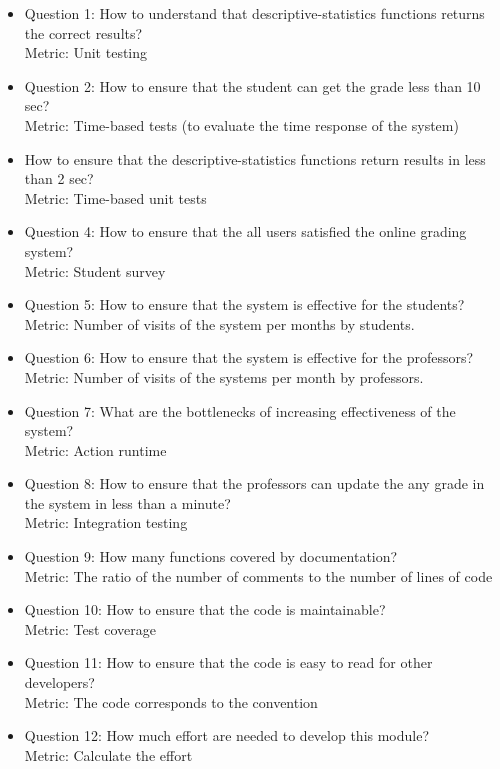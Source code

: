 \documentclass[12pt]{article}
\begin{document}
\begin{itemize}
   \item Question 1: How to understand that descriptive-statistics functions returns the correct results?\\
   Metric: Unit testing
   \item Question 2: How to ensure that the student can get the grade less than 10 sec?\\
   Metric: Time-based tests (to evaluate the time response of the system)
   \item  How to ensure that the descriptive-statistics functions return results in less than 2 sec? \\
   Metric: Time-based unit tests
   \item Question 4: How to ensure that the all users satisfied the online grading system?\\
   Metric: Student survey
   \item Question 5: How to ensure that the system is effective for the students?\\
   Metric: Number of visits of the system per months by students.
   \item Question 6: How to ensure that the system is effective for the professors?\\
   Metric: Number of visits of the systems per month by professors.
   \item Question 7: What are the bottlenecks of increasing effectiveness of the system?\\
   Metric: Action runtime
   \item Question 8: How to ensure that the professors can update the any grade in the system in less than a minute?\\
   Metric: Integration testing
   \item Question 9: How many functions covered by documentation?\\
   Metric: The ratio of the number of comments to the number of lines of code
   \item Question 10: How to ensure that the code is maintainable?\\
   Metric: Test coverage
   \item Question 11: How to ensure that the code is easy to read for other developers?\\
   Metric: The code corresponds to the convention
   \item Question 12: How much effort are needed to develop this module?\\
   Metric: Calculate the effort

\end{itemize}
\end{document}
